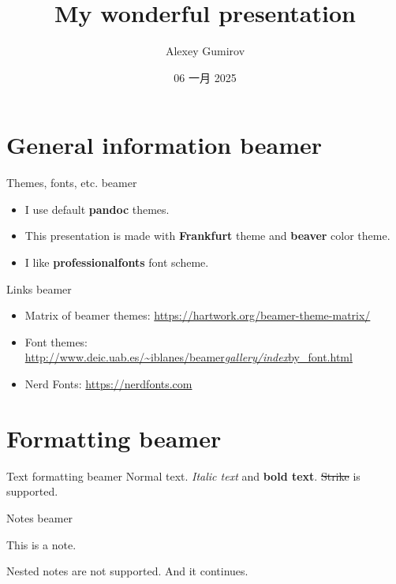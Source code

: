 \documentclass[
  11pt,
  ignorenonframetext,
  aspectratio=169,
  aspectratio=169]{beamer}
\title{My wonderful presentation}
\author{Alexey Gumirov}
\date{06 一月 2025}
\institute{My home office}
\providecommand{\tightlist}{%
  \setlength{\itemsep}{0pt}\setlength{\parskip}{0pt}}
\renewenvironment{quote}{\begin{customblockquote}\list{}{\rightmargin=0em\leftmargin=0em}%
\item\relax\color{blockquote-text}\ignorespaces}{\unskip\unskip\endlist\end{customblockquote}}
\newcommand{\st}[1]{\sout{#1}}
\begin{document}
\frame{\titlepage}

\begin{frame}
  \tableofcontents[hideallsubsections]
\end{frame}
\section{General information beamer}\label{general-information-beamer}

\begin{frame}{Themes, fonts, etc. beamer}
\label{themes-fonts-etc.-beamer}
\begin{itemize}
\tightlist
\item
  I use default \textbf{pandoc} themes.
\item
  This presentation is made with \textbf{Frankfurt} theme and
  \textbf{beaver} color theme.
\item
  I like \textbf{professionalfonts} font scheme.
\end{itemize}
\end{frame}

\begin{frame}{Links beamer}
\label{links-beamer}
\begin{itemize}
\tightlist
\item
  Matrix of beamer themes:
  \url{https://hartwork.org/beamer-theme-matrix/}
\item
  Font themes:
  \href{http://www.deic.uab.es/~iblanes/beamer_gallery/index_by_font.html}{http://www.deic.uab.es/\textasciitilde iblanes/beamer\emph{gallery/index}by\_font.html}
\item
  Nerd Fonts: \url{https://nerdfonts.com}
\end{itemize}
\end{frame}

\section{Formatting beamer}\label{formatting-beamer}

\begin{frame}{Text formatting beamer}
\label{text-formatting-beamer}
Normal text. \emph{Italic text} and \textbf{bold text}. \st{Strike} is
supported.
\end{frame}

\begin{frame}{Notes beamer}
\label{notes-beamer}
\begin{quote}
This is a note.

\begin{quote}
Nested notes are not supported. And it continues.
\end{quote}
\end{quote}
\end{frame}
\end{document}
